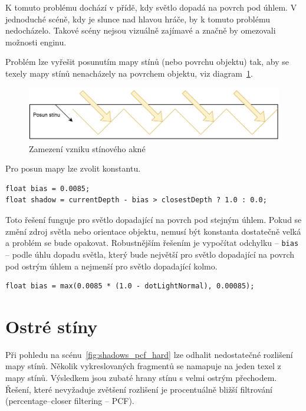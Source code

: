 \documentclass[thesis=M,czech]{FITthesis}[2019/12/23]
\begin{document}
K tomuto problému dochází v přídě, kdy světlo dopadá na povrch pod úhlem. V jednoduché scéně, kdy je slunce nad hlavou hráče, by k tomuto problému nedocházelo. Takové scény nejsou vizuálně zajímavé a značně by omezovali možnosti enginu.

Problém lze vyřešit posunutím mapy stínů (nebo povrchu objektu) tak, aby se texely mapy stínů nenacházely na povrchem objektu, viz diagram~\ref{fig:shadows_diag_acne_fix}.

\begin{figure}\centering
	\includegraphics[width=\textwidth]{images/shadows/diag_acne_fix}
	\caption[Zamezení vzniku stínového akné]{Zamezení vzniku stínového akné}\label{fig:shadows_diag_acne_fix}
\end{figure}

Pro posun mapy lze zvolit konstantu.

\begin{verbatim}
float bias = 0.0085;
float shadow = currentDepth - bias > closestDepth ? 1.0 : 0.0;
\end{verbatim}

Toto řešení funguje pro světlo dopadající na povrch pod stejným úhlem. Pokud se změní zdroj světla nebo orientace objektu, nemusí být konstanta dostatečně velká a problém se bude opakovat. Robustnějším řešením je vypočítat odchylku -- \texttt{bias} -- podle úhlu dopadu světla, který bude největší pro světlo dopadající na povrch pod ostrým úhlem a nejmenší pro světlo dopadající kolmo.

\begin{verbatim}
float bias = max(0.0085 * (1.0 - dotLightNormal), 0.00085);
\end{verbatim}

\section{Ostré stíny}

Při pohledu na scénu~\ref{fig:shadows_pcf_hard} lze odhalit nedostatečné rozlišení mapy stínů. Několik vykreslovaných fragmentů se namapuje na jeden texel z mapy stínů. Výsledkem jsou zubaté hrany stínu s velmi ostrým přechodem. Řešení, které nevyžaduje zvětšení rozlišení je procentuálně bližší filtrování (percentage--closer filtering -- PCF).
\end{document}
